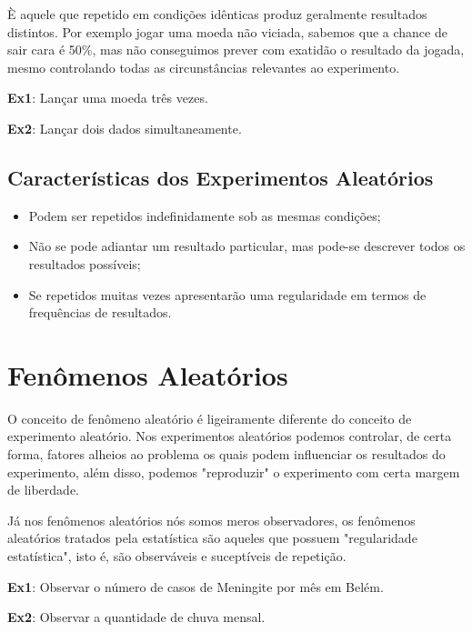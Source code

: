 È aquele que repetido em condições idênticas produz geralmente
resultados distintos. Por exemplo jogar uma moeda não viciada,
sabemos que a chance de sair cara é 50\%, mas não conseguimos
prever com exatidão o resultado da jogada, mesmo controlando todas
as circunstâncias relevantes ao experimento.\vskip0.3cm


\textbf{Ex1}: Lançar uma moeda três vezes. \vskip0.3cm

\textbf{Ex2}: Lançar dois dados simultaneamente. \vskip0.3cm

\subsection{Características dos Experimentos Aleatórios}


\begin{itemize}
    \item Podem ser repetidos indefinidamente sob as mesmas
   condições;
   \item Não se pode adiantar um resultado particular, mas
    pode-se descrever todos os resultados possíveis;
    \item Se repetidos muitas vezes apresentarão uma regularidade
    em termos de frequências de resultados.
\end{itemize}


\section{Fenômenos Aleatórios}

O conceito de fenômeno aleatório é ligeiramente diferente do
conceito de experimento aleatório. Nos experimentos aleatórios
podemos controlar, de certa forma, fatores alheios ao problema os
quais podem influenciar os resultados do experimento, além disso,
podemos "reproduzir" o experimento com certa margem de
liberdade.\vskip0.3cm

Já nos fenômenos aleatórios nós somos meros observadores, os
fenômenos aleatórios tratados pela estatística são aqueles que
possuem "regularidade estatística", isto é, são observáveis e
suceptíveis de repetição.\vskip0.3cm

\textbf{Ex1}: Observar o número de casos de Meningite por mês em
Belém. \vskip0.3cm

\textbf{Ex2}: Observar a quantidade de chuva mensal.\vskip0.3cm



